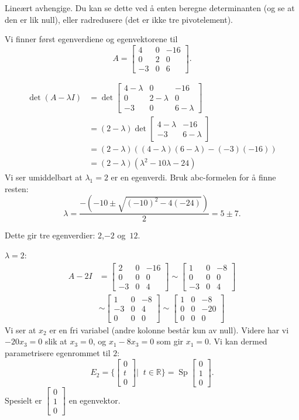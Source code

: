 \documentclass[titlepage,a4paper,12pt,norsk]{IMFeksamen}
\DeclareMathOperator{\Sp}{Sp}
\newcommand{\vvv}[3]{\begin{bmatrix} #1 \\ #2 \\ #3 \end{bmatrix}}
\newcommand{\0}{\V{0}}
\begin{document}
\begin{oppgave}
Lineært avhengige. Du kan se dette ved å enten beregne determinanten (og se at den er lik null), eller radredusere (det er ikke tre pivotelement).
\end{oppgave}


\begin{oppgave}
Vi finner først egenverdiene og egenvektorene til
\[A=
\begin{bmatrix}
4 & 0 & -16 \\
0 & 2 & 0 \\
-3 & 0 & 6
\end{bmatrix}.
\]

\begin{align*}
\det (A-\lambda I) &= \det
\begin{bmatrix}
4-\lambda & 0 & -16 \\
0 & 2-\lambda & 0 \\
-3 & 0 & 6-\lambda
\end{bmatrix}\\
&= (2-\lambda)\det
\begin{bmatrix}
4-\lambda & -16 \\
-3 &  6-\lambda
\end{bmatrix}\\
&=(2-\lambda)((4-\lambda)(6-\lambda)-(-3)(-16))\\
&=(2-\lambda)(\lambda ^2-10\lambda-24)
\end{align*}
Vi ser umiddelbart at $\lambda_1=2$ er en egenverdi. Bruk abc-formelen for å finne resten:
$$\lambda=\frac{-(-10\pm \sqrt{(-10)^2-4(-24)})}{2}=5\pm 7.$$

Dette gir tre egenverdier: $2$,$-2$ og~$12$.

\noindent 
$\lambda=2$:
\begin{align*}
A-2I &=
\begin{bmatrix}
2 & 0 & -16 \\
0 & 0 & 0 \\
-3 & 0 & 4
\end{bmatrix}
\sim
\begin{bmatrix}
1 & 0 & -8 \\
0 & 0 & 0 \\
-3 & 0 & 4
\end{bmatrix}\\
&\sim
\begin{bmatrix}
1 & 0 & -8 \\
-3 & 0 & 4 \\
0 & 0 & 0
\end{bmatrix}
\sim
\begin{bmatrix}
1 & 0 & -8 \\
0 & 0 & -20 \\
0 & 0 & 0
\end{bmatrix}
\end{align*}
Vi ser at $x_2$ er en fri variabel (andre kolonne består kun av null). Videre har vi $-20x_3=0$ slik at $x_3=0$, og $x_1-8x_3=0$ som gir $x_1=0$. Vi kan dermed parametrisere egenrommet til $2$:
$$E_2=\{\vvv{0}{t}{0}|\;\;t\in\mathbb{R}\}=\Sp \vvv{0}{1}{0}.$$ Spesielt er $\vvv{0}{1}{0}$ en egenvektor.


\end{oppgave}
\end{document}
